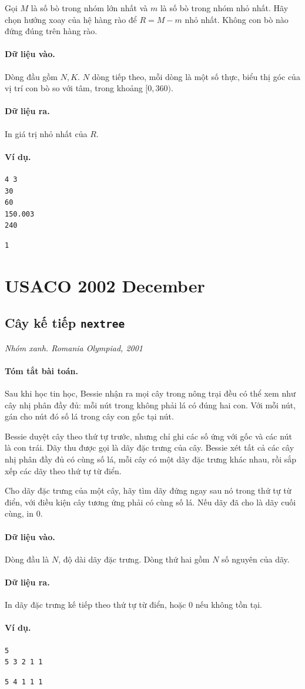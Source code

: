 \documentclass[11pt]{article}
\newcommand{\problem}[4]{%
  \subsection[#1 (#2)]{#1 \hfill {\normalsize\texttt{#2}}}%
  \noindent\textit{#3. #4}\par\smallskip
}
\newcommand{\iosec}[1]{\paragraph{#1}}
\begin{document}
Gọi \(M\) là số bò trong nhóm lớn nhất và \(m\) là số bò trong nhóm nhỏ nhất.
Hãy chọn hướng xoay của hệ hàng rào để \(R=M-m\) nhỏ nhất. Không con bò nào
đứng đúng trên hàng rào.

\iosec{Dữ liệu vào.}
Dòng đầu gồm \(N,K\). \(N\) dòng tiếp theo, mỗi dòng là một số thực, biểu thị
góc của vị trí con bò so với tâm, trong khoảng \([0,360)\).

\iosec{Dữ liệu ra.}
In giá trị nhỏ nhất của \(R\).

\iosec{Ví dụ.}
\begin{verbatim}
4 3
30
60
150.003
240
\end{verbatim}

\begin{verbatim}
1
\end{verbatim}

\section{USACO 2002 December}

\problem{Cây kế tiếp}{nextree}{Nhóm xanh}{Romania Olympiad, 2001}

\iosec{Tóm tắt bài toán.}
Sau khi học tin học, Bessie nhận ra mọi cây trong nông trại đều có thể xem như
cây nhị phân đầy đủ: mỗi nút trong không phải lá có đúng hai con. Với mỗi nút,
gán cho nút đó số lá trong cây con gốc tại nút.

Bessie duyệt cây theo thứ tự trước, nhưng chỉ ghi các số ứng với gốc và các
nút là con trái. Dãy thu được gọi là dãy đặc trưng của cây. Bessie xét tất cả
các cây nhị phân đầy đủ có cùng số lá, mỗi cây có một dãy đặc trưng khác nhau,
rồi sắp xếp các dãy theo thứ tự từ điển.

Cho dãy đặc trưng của một cây, hãy tìm dãy đứng ngay sau nó trong thứ tự từ
điển, với điều kiện cây tương ứng phải có cùng số lá. Nếu dãy đã cho là dãy
cuối cùng, in \(0\).

\iosec{Dữ liệu vào.}
Dòng đầu là \(N\), độ dài dãy đặc trưng. Dòng thứ hai gồm \(N\) số nguyên của
dãy.

\iosec{Dữ liệu ra.}
In dãy đặc trưng kế tiếp theo thứ tự từ điển, hoặc \(0\) nếu không tồn tại.

\iosec{Ví dụ.}
\begin{verbatim}
5
5 3 2 1 1
\end{verbatim}

\begin{verbatim}
5 4 1 1 1
\end{verbatim}
\end{document}
